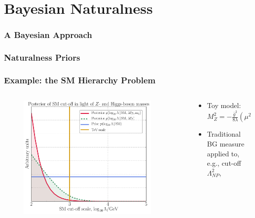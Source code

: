 \documentclass[10pt,aspectratio=169]{beamer}
\begin{document}
\section{Bayesian Naturalness}

\begin{frame}
  \frametitle{A Bayesian Approach}
\end{frame}

\begin{frame}
  \frametitle{Naturalness Priors}
\end{frame}

\begin{frame}
  \frametitle{Example: the SM Hierarchy Problem}
  \begin{columns}[t]
    \begin{column}{0.5\textwidth}
      \begin{figure}
        \includegraphics[width=0.9\textwidth]{SM_Lambda}
      \end{figure}
    \end{column}
    \begin{column}{0.5\textwidth}
      \begin{itemize} \itemsep1em
      \item Toy model: $M_Z^2 = -\frac{\bar{g}^2}{8 \lambda} (\mu^2
        + \Lambda_{NP}^2)$
      \item Traditional BG measure applied to, e.g., cut-off $\Lambda_{NP}^2$,
        \begin{equation*}

\end{equation*}
\end{itemize}
\end{column}
\end{columns}
\end{frame}
\end{document}
